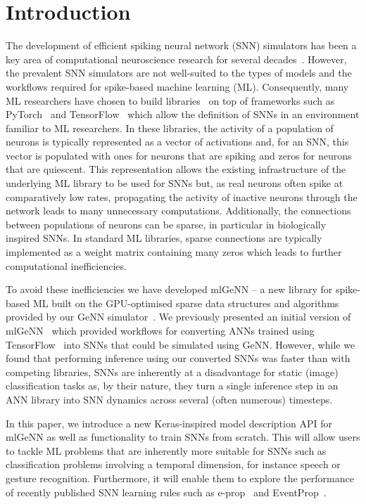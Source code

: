 \documentclass[sigconf]{acmart}
\begin{document}
\section{Introduction}
The development of efficient spiking neural network (SNN) simulators has been a key area of computational neuroscience research for several decades~\citep{carnevale2006neuron, Gewaltig2007, Golosio2021, Akar2019,Yavuz2016}.
However, the prevalent SNN simulators are not well-suited to the types of models and the workflows required for spike-based machine learning (ML).
Consequently, many ML researchers have chosen to build libraries~\citep{norse2021, SpikingJelly,eshraghian2021training,Hazan2018,zhao_neko_2021} on top of frameworks such as PyTorch~\citep{paszke2019pytorch} and TensorFlow~\citep{TensorFlow} which allow the definition of SNNs in an environment familiar to ML researchers.
In these libraries, the activity of a population of neurons is typically represented as a vector of activations and, for an SNN, this vector is populated with ones for neurons that are spiking and zeros for neurons that are quiescent. 
This representation allows the existing infrastructure of the underlying ML library to be used for SNNs but, as real neurons often spike at comparatively low rates, propagating the activity of inactive neurons through the network leads to many unnecessary computations.
Additionally, the connections between populations of neurons can be sparse, in particular in biologically inspired SNNs. In standard ML libraries, sparse connections are typically implemented as a weight matrix containing many zeros which leads to further computational inefficiencies.

To avoid these inefficiencies we have developed mlGeNN -- a new library for spike-based ML built on the GPU-optimised sparse data structures and algorithms provided by our GeNN simulator~\citep{Yavuz2016,Knight2018,Knight2021}.
We previously presented an initial version of mlGeNN~\citep{Turner2022} which provided workflows for converting ANNs trained using TensorFlow~\citep{TensorFlow} into SNNs that could be simulated using GeNN.
However, while we found that performing inference using our converted SNNs was faster than with competing libraries, SNNs are inherently at a disadvantage for static (image) classification tasks as, by their nature, they turn a single inference step in an ANN library into SNN dynamics across several (often numerous) timesteps.

In this paper, we introduce a new Keras-inspired model description API for mlGeNN as well as functionality to train SNNs from scratch.
This will allow users to tackle ML problems that are inherently more suitable for SNNs such as classification problems involving a temporal dimension, for instance speech or gesture recognition. Furthermore, it will enable them to explore the performance of recently published SNN learning rules such as e-prop~\citep{Bellec2020} and EventProp~\citep{Wunderlich2021}.
\end{document}
